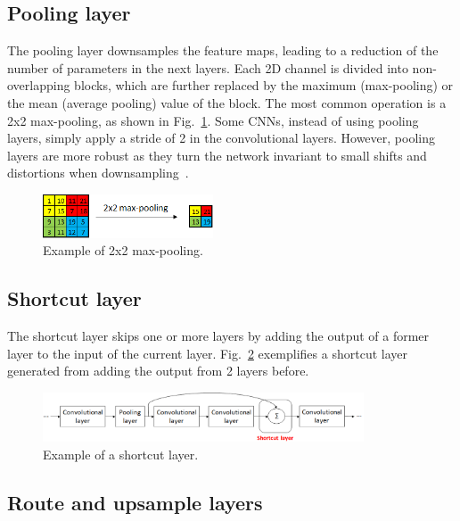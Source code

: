\subsection{Pooling layer}

The pooling layer downsamples the feature maps, leading to a reduction of the number of parameters in the next layers. Each 2D channel is divided into non-overlapping blocks, which are further replaced by the maximum (max-pooling) or the mean (average pooling) value of the block. The most common operation is a 2x2 max-pooling, as shown in Fig.~\ref{fig:maxpool}. Some CNNs, instead of using pooling layers, simply apply a stride of 2 in the convolutional layers. However, pooling layers are more robust as they turn the network invariant to small shifts and distortions when downsampling~\cite{sze:dnn_survey}. 

\begin{figure}[!htb]
  \centering
  \includegraphics[width=0.45\textwidth]{Figures/maxpool.png}
  \caption{Example of 2x2 max-pooling.}
  \label{fig:maxpool}
\end{figure}
\vspace{-0.3cm}

\subsection{Shortcut layer}
The shortcut layer skips one or more layers by adding the output of a former layer to the input of the current layer. Fig.~\ref{fig:shortcut} exemplifies a shortcut layer generated from adding the output from 2 layers before.

\begin{figure}[!htb]
  \centering
  \includegraphics[width=0.85\textwidth]{Figures/shortcut_layer.png}
  \caption{Example of a shortcut layer.}
  \label{fig:shortcut}
\end{figure}
\vspace{-0.3cm}

\subsection{Route and upsample layers}

